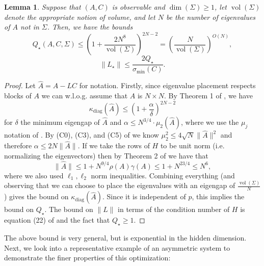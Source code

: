 \documentclass[11pt]{article}
\newtheorem{lemma}[theorem]{Lemma}
\numberwithin{equation}{section}
\begin{document}
\begin{lemma}
\label{lemma:ackermannbounds}
Suppose that $(A, C)$ is observable and $\dim(\Sigma) \geq 1$, let $\operatorname{vol}(\Sigma)$ denote the appropriate notion of volume, and let $N$ be the number of eigenvalues of $A$ not in $\Sigma$. Then, we have the bounds
$$Q_\star(A, C, \Sigma) \leq \left(1+\frac{2N^8}{\operatorname{vol}(\Sigma)}\right)^{2N-2} = \left(\frac{N}{\operatorname{vol}(\Sigma)}\right)^{O(N)},$$
$$\|L_\star\| \leq \frac{2Q_\star}{\sigma_{\textrm{min}}(C)}.$$
\end{lemma}
\begin{proof}
Let $\hat{A} = A - LC$ for notation. Firstly, since eigenvalue placement respects blocks of $A$ we can w.l.o.g. assume that $A$ is $N \times N$.
By Theorem 1 of 
\cite{conditionnumbereigengap}, we have
$$\kappa_{\textrm{diag}}(\hat{A}) \leq \left(1 + \frac{\alpha}{\delta}\right)^{2N-2}$$
for $\delta$ the minimum eigengap of $\hat{A}$ and $\alpha \leq N^{3/4} \cdot \mu_2(\hat{A})$, where we use the $\mu_j$ notation of 
\cite{nonnormality}. By (C0), (C3), and (C5) of \cite{nonnormality} we know $\mu_2^2 \leq 4\sqrt{N} \|\hat{A}\|^2$ and therefore $\alpha \leq 2N\|\hat{A}\|$. If we take the rows of $H$ to be unit norm (i.e. normalizing the eigenvectors) then by Theorem 2 of 
\cite{Gheorghiu2003}
we have that $$\|\hat{A}\| \leq 1 + N^{9/4} \rho(A) \gamma(A) \leq 1 + N^{23/4} \leq N^6,$$
where we also used $\ell_1,\ell_2$ norm inequalities.
Combining everything (and observing that we can choose to place the eigenvalues with an eigengap of $\frac{\operatorname{vol}(\Sigma)}{N}$) gives the bound on $\kappa_{\textrm{diag}}(\hat{A})$. Since it is independent of $p$, this implies the bound on $Q_\star$.
The bound on $\|L\|$ in terms of the condition number of $H$ is equation (22) of \cite{gainsizebound}
and the fact that $Q_\star \geq 1$.
\end{proof}
The above bound is very general, but is exponential in the hidden dimension. 
Next, we look into a representative example of an asymmetric system to demonstrate the finer properties of this optimization:
\end{document}
